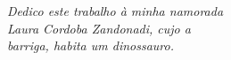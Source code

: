 
\begin{dedicatoria}
    \vspace*{\fill}    
    \begin{flushright}
        \noindent
        \textit{ Dedico este trabalho à minha namorada\\Laura Cordoba Zandonadi, cujo a\\barriga, habita um dinossauro.}\vspace*{2cm}
    \end{flushright}
\end{dedicatoria}